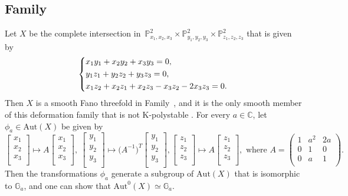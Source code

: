 \documentclass[12pt]{amsart}
\theoremstyle{definition}
\theoremstyle{remark}
\begin{document}
\subsection{Family }
\label{subsection:3-13}

Let $X$ be the complete intersection in~$\mathbb{P}^2_{x_1,x_2,x_3}\times\mathbb{P}^2_{y_1,y_2,y_3}\times\mathbb{P}^2_{z_1,z_2,z_3}$ that is given by
$$
\left\{\aligned
&x_1y_1+x_2y_2+x_3y_3=0,\\
&y_1z_1+y_2z_2+y_3z_3=0,\\
&x_1z_2+x_2z_1+x_2z_3-x_3z_2-2x_3z_3=0.\\
\endaligned
\right.
$$
Then $X$ is a smooth Fano threefold in Family~, and it is the only smooth member of this deformation family that is not K-polystable \cite{Book}.
For every $a\in\mathbb{C}$, let $\phi_a\in\mathrm{Aut}(X)$ be given by
$$
\left[
  \begin{array}{c}
    x_1 \\
    x_2\\
    x_3 \\
  \end{array}
\right]\mapsto
A\left[
  \begin{array}{c}
    x_1 \\
    x_2\\
    x_3 \\
  \end{array}
\right],\ \left[
  \begin{array}{c}
    y_1 \\
    y_2\\
    y_3 \\
  \end{array}
\right]\mapsto
\big(A^{-1}\big)^T\left[
  \begin{array}{c}
    y_1 \\
    y_2\\
    y_3 \\
  \end{array}
\right],
\left[
  \begin{array}{c}
    z_1 \\
    z_2\\
    z_3 \\
  \end{array}
\right]\mapsto
A\left[
  \begin{array}{c}
    z_1 \\
    z_2\\
    z_3 \\
  \end{array}
\right],
\text{ where }
A=\left(
  \begin{array}{ccc}
    1 & a^2 & 2a \\
    0 & 1 & 0 \\
    0 & a~& 1 \\
  \end{array}
\right).
$$
Then the transformations $\phi_a$ generate a subgroup of $\mathrm{Aut}(X)$ that is isomorphic to $\mathbb{G}_{a}$, and one can show that $\mathrm{Aut}^0(X)\simeq\mathbb{G}_{a}$.
\end{document}
